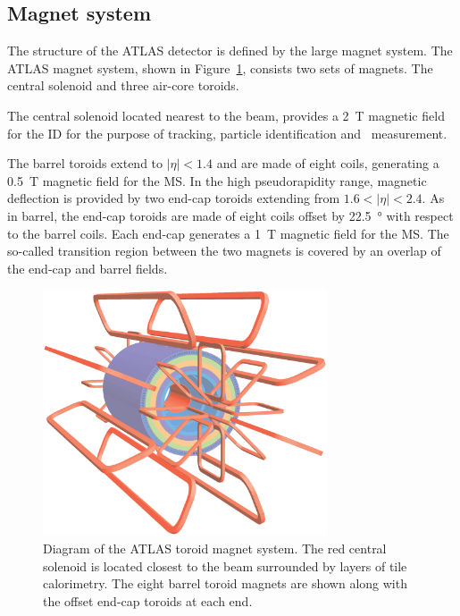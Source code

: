 \subsection{Magnet system}
The structure of the ATLAS detector is defined by the large magnet system. The ATLAS magnet system, shown in Figure~\ref{fig:DetectorMagnet}, consists two sets of magnets. The central solenoid and three air-core toroids.

The central solenoid located nearest to the beam, provides a \SI{2}{\tesla} magnetic field for the ID for the purpose of tracking, particle identification and \pt\ measurement.

The barrel toroids extend to $|\eta|<1.4$ and are made of eight coils, generating a \SI{0.5}{\tesla} magnetic field for the MS. In the high pseudorapidity range, magnetic deflection is provided by two end-cap toroids extending from $1.6<|\eta|<2.4$. As in barrel, the end-cap toroids are made of eight coils offset by \SI{22.5}{\degree} with respect to the barrel coils. Each end-cap generates a \SI{1}{\tesla} magnetic field for the MS. The so-called transition region between the two magnets is covered by an overlap of the end-cap and barrel fields.

\begin{figure}[htbp]
  \centering
  \includegraphics[width=0.75\textwidth]{PartDetector/Diagrams/ATLcoilGeom.eps}
  \caption{Diagram of the ATLAS toroid magnet system. The red central solenoid is located closest to the beam surrounded by layers of tile calorimetry. The eight barrel toroid magnets are shown along with the offset end-cap toroids at each end.}
  \label{fig:DetectorMagnet}
\end{figure}

